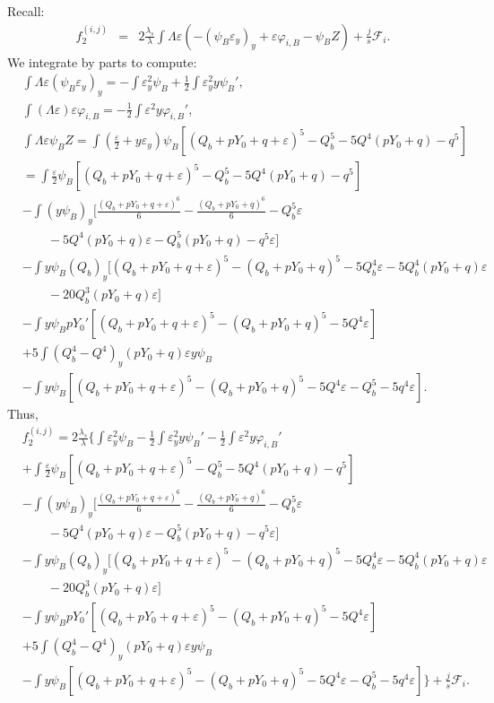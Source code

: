 \documentclass[11pt,a4paper,reqno]{amsart}
\theoremstyle{remark}
\numberwithin{equation}{section}
\newcommand{\bee}{\begin{eqnarray*}}
\newcommand{\eee}{\end{eqnarray*}}
\def\e{\varepsilon}
\def\lsl{\frac{\lambda_s}{\lambda}}
\def\lsl{\frac{\lambda_s}{\lambda}}
\def\Yz{Y_0}
\begin{document}
Recall:
\bee
f^{(i,j)}_2 &= & 2 {\frac{{\lambda}_s}{{\lambda}}}  \int    {\Lambda} \varepsilon  \left( - (\psi_B\varepsilon_y)_y +  \varepsilon\varphi_{i,B} -\psi_BZ \right)+\frac js\mathcal F_{i}.
\eee
We integrate by parts to compute:
\begin{align*}
 & \int {\Lambda} \varepsilon (\psi_B\varepsilon_{y})_{y} =  -\int \e_y^2 \psi_B + \frac 12 \int \e^2_y y \psi_B',\\
 & \int  ({\Lambda} \varepsilon )    \varepsilon \varphi_{i,B} =- \frac 12 \int     \varepsilon^2    y\varphi_{i,B}',\\
 & \int {\Lambda} \varepsilon\psi_BZ
 = 
\int \left( \frac \e 2 + y\e_y\right) \psi_B  \left[ (Q_b+p\Yz+q+\e)^5 - Q_b^5 
-5 Q^4 (p\Yz+q)-q^5\right]\\
& = \int \frac \e 2 \psi_B \left[ (Q_b+p\Yz+q+\e)^5 - Q_b^5 
-5 Q^4 (p\Yz+q)-q^5\right]\\
& - \int (y\psi_B)_y  \bigg[ \frac {(Q_b+p\Yz+q+\e)^6} 6  
- \frac {(Q_b+p\Yz+q)^6} 6  - Q_b^5 \e \\&\qquad  - 5 Q^4(p\Yz+q) \e- Q_b^5 (p\Yz+q) -q^5 \e\bigg]\\
& - \int y \psi_B (Q_b)_y \big[ (Q_b+p\Yz+q+\e)^5 - (Q_b+p\Yz+q)^5 - 5Q_b^4 \e - 5 Q_b^4 (p\Yz+q) \e \\ &\qquad - 20 Q_b^3 (p\Yz+q) \e\big] \\
& - \int y \psi_B p\Yz' \left[ (Q_b+p\Yz+q+\e)^5 - (Q_b+p\Yz+q)^5 - 5Q^4 \e\right]\\
&+5 \int (Q_b^4 - Q^4)_y (p\Yz+q) \e y \psi_B\\
& - \int y \psi_B \left[ (Q_b+p\Yz+q+\e)^5 - (Q_b+p\Yz + q)^5 - 5Q^4 \e - Q_b^5 - 5 q^4 \e\right].
\end{align*}
Thus,
 \begin{align*}
& f^{(i,j)}_2 = 2 \lsl \bigg\{   \int \e_y^2 \psi_B -\frac 12 \int \e^2_y y \psi_B' - \frac 12 \int     \varepsilon^2    y\varphi_{i,B}'
 \\& + \int \frac \e 2 \psi_B \left[ (Q_b+p\Yz+q+\e)^5 - Q_b^5 
-5 Q^4 (p\Yz+q)-q^5\right]\\
& - \int (y\psi_B)_y  \bigg[ \frac {(Q_b+p\Yz+q+\e)^6} 6  
- \frac {(Q_b+p\Yz+q)^6} 6  - Q_b^5 \e \\ &  \qquad  - 5 Q^4(p\Yz+q) \e- Q_b^5 (p\Yz+q) -q^5 \e\bigg]\\
& - \int y \psi_B (Q_b)_y \big[ (Q_b+p\Yz+q+\e)^5 - (Q_b+p\Yz+q)^5 - 5Q_b^4 \e - 5 Q_b^4 (p\Yz+q) \e \\ &\qquad - 20 Q_b^3 (p\Yz+q) \e\big] \\
& - \int y \psi_B p\Yz' \left[ (Q_b+p\Yz+q+\e)^5 - (Q_b+p\Yz+q)^5 - 5Q^4 \e\right]\\
&+5 \int (Q_b^4 - Q^4)_y (p\Yz+q) \e y \psi_B\\
& - \int y \psi_B \left[ (Q_b+p\Yz+q+\e)^5 - (Q_b+p\Yz + q)^5 - 5Q^4 \e - Q_b^5 - 5 q^4 \e\right]\bigg\} +\frac js\mathcal F_{i}.
  \end{align*}
\end{document}
